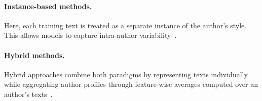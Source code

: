 \paragraph{Instance-based methods.} 
Here, each training text is treated as a separate instance of the author's style. 
This allows models to capture intra-author variability~\citep{stamatatos_survey_2009,altakrori_topic_2021,elmanarelbouanani_authorship_2014,neal_surveying_2018}.  

\paragraph{Hybrid methods.} 
Hybrid approaches combine both paradigms by representing texts individually while aggregating author profiles through feature-wise averages computed over an author’s texts~\citep{stamatatos_survey_2009}. 
